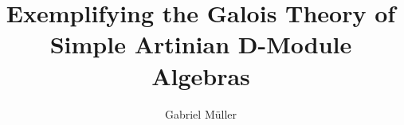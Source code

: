 \documentclass[11pt]{beamer}
\author{Gabriel M\"uller}
\title{Exemplifying the Galois Theory of Simple Artinian D-Module Algebras}
\begin{document}
\begin{frame}
\titlepage
\end{frame}

\begin{frame}
\tableofcontents
\end{frame}



\end{document}
